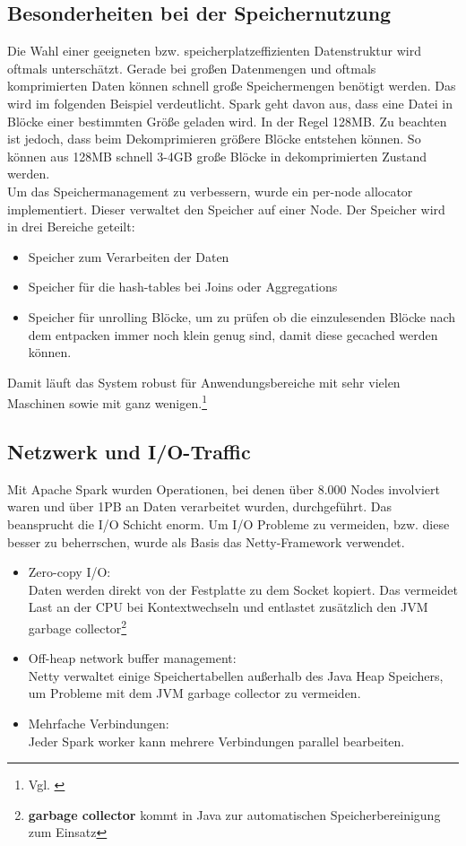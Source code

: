 \subsection{Besonderheiten bei der Speichernutzung}
Die Wahl einer geeigneten bzw. speicherplatzeffizienten Datenstruktur wird oftmals unterschätzt. Gerade bei großen Datenmengen und oftmals komprimierten Daten können schnell große Speichermengen benötigt werden. Das wird im folgenden Beispiel verdeutlicht.
Spark geht davon aus, dass eine Datei in Blöcke einer bestimmten Größe geladen wird. In der Regel 128MB. Zu beachten ist jedoch, dass beim Dekomprimieren größere Blöcke entstehen können. So können aus 128MB schnell 3-4GB große Blöcke in dekomprimierten Zustand werden. \\ 

\noindent
Um das Speichermanagement zu verbessern, wurde ein per-node allocator implementiert. Dieser verwaltet den Speicher auf einer Node. 
Der Speicher wird in drei Bereiche geteilt:
\begin{itemize}
	\item Speicher zum Verarbeiten der Daten
	\item Speicher für die hash-tables bei Joins oder Aggregations
	\item Speicher für \glqq{}unrolling\grqq{} Blöcke, um zu prüfen ob die einzulesenden Blöcke nach dem entpacken immer noch klein genug sind, damit diese gecached werden können.
\end{itemize}
\noindent
Damit läuft das System robust für Anwendungsbereiche mit sehr vielen Maschinen sowie mit ganz wenigen.\footnote{Vgl. \cite{ADD+15}}

\subsection{Netzwerk und I/O-Traffic}

Mit Apache Spark wurden Operationen, bei denen über 8.000 Nodes involviert waren und über 1PB an Daten verarbeitet wurden, durchgeführt. Das beansprucht die I/O Schicht enorm.
Um I/O Probleme zu vermeiden, bzw. diese besser zu beherrschen, wurde als Basis das Netty-Framework verwendet.
\begin{itemize}
	\item Zero-copy I/O:\\
	Daten werden direkt von der Festplatte zu dem Socket kopiert. Das vermeidet Last an der CPU bei Kontextwechseln und entlastet zusätzlich den JVM garbage collector\footnote{\textbf{garbage collector} kommt in Java zur automatischen Speicherbereinigung zum Einsatz}
	\item Off-heap network buffer management:\\
	Netty verwaltet einige Speichertabellen außerhalb des Java Heap Speichers, um Probleme mit dem JVM garbage collector zu vermeiden.
	\item Mehrfache Verbindungen:\\
	Jeder Spark worker kann mehrere Verbindungen parallel bearbeiten.
\end{itemize}


